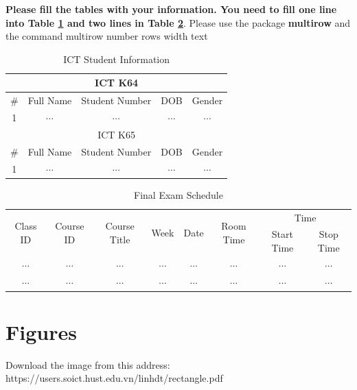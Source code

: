 \documentclass{article}
\begin{document}
		\textbf{Please fill the tables with your information. You need to fill one line into Table \ref{tab:1} and two lines in Table \ref{tab:2}}. Please use the package \textbf{multirow} and the command multirow number rows width text
		\begin{table}[h]
		\centering
		\caption{ICT Student Information}
			\begin{tabular}{|c|c|c|c|c|}
				\hline
				\multicolumn{5}{|c|}{ICT K64} \\
				\hline
				\# & Full Name & Student Number & DOB & Gender \\
				\hline
				1 & $\cdots$ & $\cdots$ & $\cdots$ & $\cdots$ \\
				\hline
				\multicolumn{5}{|c|}{ICT K65} \\
				\hline
				\# & Full Name & Student Number & DOB & Gender \\
				\hline
				1 & $\cdots$ & $\cdots$ & $\cdots$ & $\cdots$ \\
				\hline
			\end{tabular}
		\label{tab:1}
		\end{table}
		\begin{table}[h]
		\centering
		\caption{Final Exam Schedule}
			\begin{tabular}{|c|c|c|c|c|c|c|c|}
				\hline
				\multirow{2}{*}{Class ID} & \multirow{2}{*}{Course ID} & \multirow{2}{*}{Course Title} & \multirow{2}{*}{Week} & \multirow{2}{*}{Date} & \multirow{2}{*}{Room Time} & \multicolumn{2}{|c|}{Time} \\
				\cline{7-8}
				&  &  &  &  &  & Start Time & Stop Time \\
				\hline
				$\cdots$ & $\cdots$ & $\cdots$ & $\cdots$ & $\cdots$ & $\cdots$ & $\cdots$ & $\cdots$\\
				\hline
				$\cdots$ & $\cdots$ & $\cdots$ & $\cdots$ & $\cdots$ & $\cdots$ & $\cdots$ & $\cdots$\\
				\hline
			\end{tabular}
		\label{tab:2}
		\end{table}
	\section{Figures}
		Download the image from this address:\\
		https://users.soict.hust.edu.vn/linhdt/rectangle.pdf
		
\end{document}
